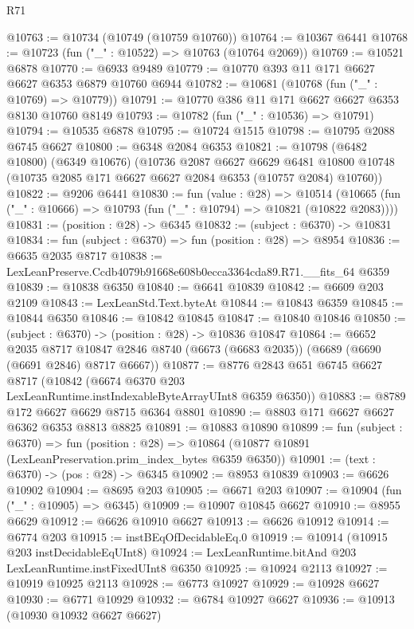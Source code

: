 \begin{lexlean}{R71}
\begin{coremodule}
@10763 := @10734 (@10749 (@10759 @10760))
@10764 := @10367 @6441
@10768 := @10723 (fun ("_" : @10522) => @10763 (@10764 @2069))
@10769 := @10521 @6878
@10770 := @6933 @9489
@10779 := @10770 @393 @11 @171 @6627 @6627 @6353 @6879 @10760 @6944
@10782 := @10681 (@10768 (fun ("_" : @10769) => @10779))
@10791 := @10770 @386 @11 @171 @6627 @6627 @6353 @8130 @10760 @8149
@10793 := @10782 (fun ("_" : @10536) => @10791)
@10794 := @10535 @6878
@10795 := @10724 @1515
@10798 := @10795 @2088 @6745 @6627
@10800 := @6348 @2084 @6353
@10821 := @10798
    (@6482 @10800)
    (@6349 @10676)
    (@10736
      @2087
      @6627
      @6629
      @6481
      @10800
      @10748
      (@10735 @2085 @171 @6627 @6627 @2084 @6353 (@10757 @2084) @10760))
@10822 := @9206 @6441
@10830 := fun (value : @28) =>
  @10514 (@10665 (fun ("_" : @10666) => @10793 (fun ("_" : @10794) => @10821 (@10822 @2083))))
@10831 := (position : @28) -> @6345
@10832 := (subject : @6370) -> @10831
@10834 := fun (subject : @6370) => fun (position : @28) => @8954
@10836 := @6635 @2035 @8717
@10838 := LexLeanPreserve.Ccdb4079b91668e608b0ecca3364cda89.R71.__fits_64 @6359
@10839 := @10838 @6350
@10840 := @6641 @10839
@10842 := @6609 @203 @2109
@10843 := LexLeanStd.Text.byteAt
@10844 := @10843 @6359
@10845 := @10844 @6350
@10846 := @10842 @10845
@10847 := @10840 @10846
@10850 := (subject : @6370) -> (position : @28) -> @10836 @10847
@10864 := @6652
    @2035
    @8717
    @10847
    @2846
    @8740
    (@6673 (@6683 @2035))
    (@6689 (@6690 (@6691 @2846) @8717 @6667))
@10877 := @8776
    @2843
    @651
    @6745
    @6627
    @8717
    (@10842 (@6674 @6370 @203 LexLeanRuntime.instIndexableByteArrayUInt8 @6359 @6350))
@10883 := @8789 @172 @6627 @6629 @8715 @6364 @8801
@10890 := @8803 @171 @6627 @6627 @6362 @6353 @8813 @8825
@10891 := @10883 @10890
@10899 := fun (subject : @6370) =>
  fun (position : @28) => @10864 (@10877 @10891 (LexLeanPreservation.prim_index_bytes @6359 @6350))
@10901 := (text : @6370) -> (pos : @28) -> @6345
@10902 := @8953 @10839
@10903 := @6626 @10902
@10904 := @8695 @203
@10905 := @6671 @203
@10907 := @10904 (fun ("_" : @10905) => @6345)
@10909 := @10907 @10845 @6627
@10910 := @8955 @6629
@10912 := @6626 @10910 @6627
@10913 := @6626 @10912
@10914 := @6774 @203
@10915 := instBEqOfDecidableEq.{0}
@10919 := @10914 (@10915 @203 instDecidableEqUInt8)
@10924 := LexLeanRuntime.bitAnd @203 LexLeanRuntime.instFixedUInt8 @6350
@10925 := @10924 @2113
@10927 := @10919 @10925 @2113
@10928 := @6773 @10927
@10929 := @10928 @6627
@10930 := @6771 @10929
@10932 := @6784 @10927 @6627
@10936 := @10913 (@10930 @10932 @6627 @6627)

\end{coremodule}
\end{lexlean}
